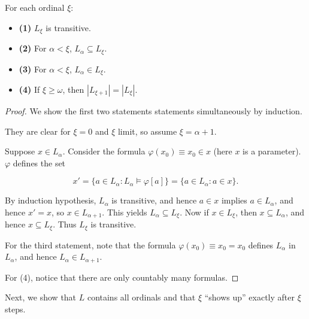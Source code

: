 \begin{proposition}\label{prop-basics-l}For each ordinal $\xi$:

\begin{itemize}
\item \textbf{(1)} $L_\xi$ is transitive.
\item \textbf{(2)} For $\alpha < \xi$, $L_\alpha \subseteq L_\xi$.
\item \textbf{(3)} For $\alpha < \xi$, $L_\alpha \in L_\xi$.
\item \textbf{(4)} If $\xi \geq \omega$, then $|L_{\xi+1}| = |L_\xi|$.
\end{itemize}

\end{proposition}\begin{proof}We show the first two statements statements simultaneously by induction.

They are clear for $\xi = 0$ and $\xi$ limit, so assume $\xi = \alpha +1$.

Suppose $x \in L_\alpha$. Consider the formula $\varphi(x_0) \equiv x_0 \in x$ (here $x$ is a parameter). $\varphi$ defines the set

\begin{equation}
x' = \{a \in L_\alpha \colon L_\alpha \models \varphi[a] \} = \{ a \in L_\alpha \colon a \in x \}.
\end{equation}

By induction hypothesis, $L_\alpha$ is transitive, and hence $a \in x$ implies $a \in L_\alpha$, and hence $x' = x$, so $x \in L_{\alpha+1}$. This yields $L_\alpha \subseteq L_\xi$. Now if $x \in L_\xi$, then $x \subseteq L_\alpha$, and hence $x \subseteq L_\xi$. Thus $L_\xi$ is transitive.

For the third statement, note that the formula $\varphi(x_0) \equiv x_0 = x_0$ defines $L_\alpha$ in $L_\alpha$, and hence $L_\alpha \in L_{\alpha + 1}$.

For (4), notice that there are only countably many formulas.

\end{proof}Next, we show that $L$ contains all ordinals and that $\xi$ ``shows up'' exactly after $\xi$ steps.


